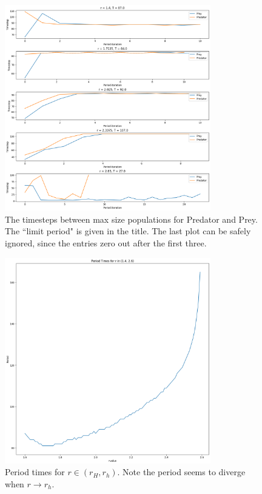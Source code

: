 \begin{solution}
    \clearpage
    

    \begin{figure}
        \centering
        \includegraphics[width = 0.8\textwidth]{Images/Period timings.png}
        \caption{The timesteps between max size populations for Predator and Prey. The ``limit period" is given in the title. The last plot can be safely ignored, since the entries zero out after the first three.}
        \label{fig:p2c Period timings}
    \end{figure}
    \clearpage
    

    \begin{figure}
        \centering
        \includegraphics[width = 0.8\textwidth]{Images/Period Divergance.png}
        \caption{Period times for $r \in (r_H, r_h)$. Note the period seems to diverge when $r \rightarrow r_h$.}
        \label{fig:p2c Period div}
    \end{figure}

    \clearpage
    
\end{solution}

